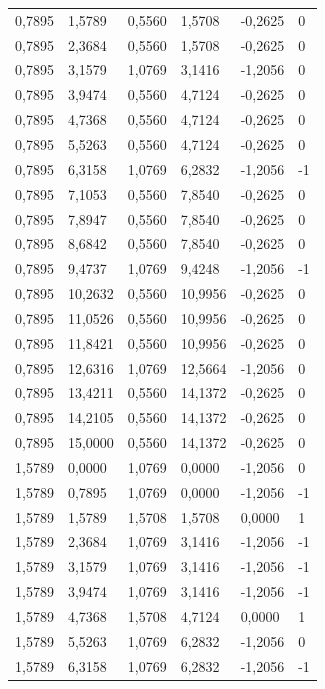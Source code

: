 \documentclass[12pt]{article}
\begin{document}
\begin{longtable}{@{}llllll@{}}
		0,7895  & 1,5789  & 0,5560  & 1,5708  & -0,2625  & 0  \\
		0,7895  & 2,3684  & 0,5560  & 1,5708  & -0,2625  & 0  \\
		0,7895  & 3,1579  & 1,0769  & 3,1416  & -1,2056  & 0  \\
		0,7895  & 3,9474  & 0,5560  & 4,7124  & -0,2625  & 0  \\
		0,7895  & 4,7368  & 0,5560  & 4,7124  & -0,2625  & 0  \\
		0,7895  & 5,5263  & 0,5560  & 4,7124  & -0,2625  & 0  \\
		0,7895  & 6,3158  & 1,0769  & 6,2832  & -1,2056  & -1 \\
		0,7895  & 7,1053  & 0,5560  & 7,8540  & -0,2625  & 0  \\
		0,7895  & 7,8947  & 0,5560  & 7,8540  & -0,2625  & 0  \\
		0,7895  & 8,6842  & 0,5560  & 7,8540  & -0,2625  & 0  \\
		0,7895  & 9,4737  & 1,0769  & 9,4248  & -1,2056  & -1 \\
		0,7895  & 10,2632 & 0,5560  & 10,9956 & -0,2625  & 0  \\
		0,7895  & 11,0526 & 0,5560  & 10,9956 & -0,2625  & 0  \\
		0,7895  & 11,8421 & 0,5560  & 10,9956 & -0,2625  & 0  \\
		0,7895  & 12,6316 & 1,0769  & 12,5664 & -1,2056  & 0  \\
		0,7895  & 13,4211 & 0,5560  & 14,1372 & -0,2625  & 0  \\
		0,7895  & 14,2105 & 0,5560  & 14,1372 & -0,2625  & 0  \\
		0,7895  & 15,0000 & 0,5560  & 14,1372 & -0,2625  & 0  \\
		1,5789  & 0,0000  & 1,0769  & 0,0000  & -1,2056  & 0  \\
		1,5789  & 0,7895  & 1,0769  & 0,0000  & -1,2056  & -1 \\
		1,5789  & 1,5789  & 1,5708  & 1,5708  & 0,0000   & 1  \\
		1,5789  & 2,3684  & 1,0769  & 3,1416  & -1,2056  & -1 \\
		1,5789  & 3,1579  & 1,0769  & 3,1416  & -1,2056  & -1 \\
		1,5789  & 3,9474  & 1,0769  & 3,1416  & -1,2056  & -1 \\
		1,5789  & 4,7368  & 1,5708  & 4,7124  & 0,0000   & 1  \\
		1,5789  & 5,5263  & 1,0769  & 6,2832  & -1,2056  & 0  \\
		1,5789  & 6,3158  & 1,0769  & 6,2832  & -1,2056  & -1 \\

\end{longtable}
\end{document}
